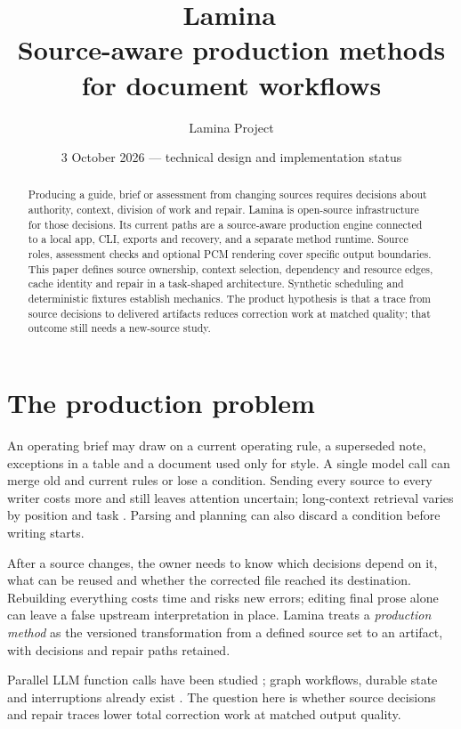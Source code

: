 \documentclass[11pt,letterpaper]{article}
\title{\vspace{-1.1em}\textbf{Lamina}\,\\[0.2em]\large Source-aware production methods for document workflows}
\author{Lamina Project}
\date{3 October 2026 --- technical design and implementation status}
\begin{document}
\maketitle
\vspace{-1.4em}
\begin{abstract}
Producing a guide, brief or assessment from changing sources requires decisions about authority, context, division of work and repair. Lamina is open-source infrastructure for those decisions. Its current paths are a source-aware production engine connected to a local app, CLI, exports and recovery, and a separate method runtime. Source roles, assessment checks and optional PCM rendering cover specific output boundaries. This paper defines source ownership, context selection, dependency and resource edges, cache identity and repair in a task-shaped architecture. Synthetic scheduling and deterministic fixtures establish mechanics. The product hypothesis is that a trace from source decisions to delivered artifacts reduces correction work at matched quality; that outcome still needs a new-source study.
\end{abstract}

\section{The production problem}
An operating brief may draw on a current operating rule, a superseded note, exceptions in a table and a document used only for style. A single model call can merge old and current rules or lose a condition. Sending every source to every writer costs more and still leaves attention uncertain; long-context retrieval varies by position and task \cite{liu2024lost}. Parsing and planning can also discard a condition before writing starts.

After a source changes, the owner needs to know which decisions depend on it, what can be reused and whether the corrected file reached its destination. Rebuilding everything costs time and risks new errors; editing final prose alone can leave a false upstream interpretation in place. Lamina treats a \emph{production method} as the versioned transformation from a defined source set to an artifact, with decisions and repair paths retained.

Parallel LLM function calls have been studied \cite{kim2024llmcompiler}; graph workflows, durable state and interruptions already exist \cite{langgraph2026,googleadk2026}. The question here is whether source decisions and repair traces lower total correction work at matched output quality.
\end{document}
